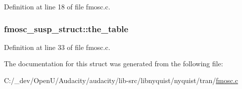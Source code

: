 Definition at line 18 of file fmosc.\+c.

\subsubsection[{\texorpdfstring{the\+\_\+table}{the_table}}]{ fmosc\+\_\+susp\+\_\+struct\+::the\+\_\+table}\hypertarget{structfmosc__susp__struct_abf74c5eb78455f634af2ea1d7fff6683}{}\label{structfmosc__susp__struct_abf74c5eb78455f634af2ea1d7fff6683}


Definition at line 33 of file fmosc.\+c.



The documentation for this struct was generated from the following file\+:\begin{DoxyCompactItemize}
\item 
C\+:/\+\_\+dev/\+Open\+U/\+Audacity/audacity/lib-\/src/libnyquist/nyquist/tran/\hyperlink{fmosc_8c}{fmosc.\+c}\end{DoxyCompactItemize}
